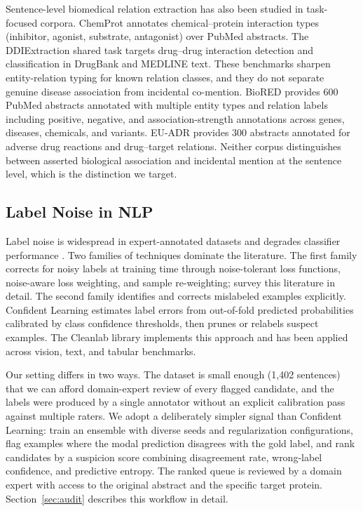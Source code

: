\documentclass[sn-basic,pdflatex]{sn-jnl}
\begin{document}
Sentence-level biomedical relation extraction has also been studied in task-focused corpora. ChemProt \citep{peng2018chemprot} annotates chemical--protein interaction types (inhibitor, agonist, substrate, antagonist) over PubMed abstracts. The DDIExtraction shared task \citep{segurabedmar2013ddi} targets drug--drug interaction detection and classification in DrugBank and MEDLINE text. These benchmarks sharpen entity-relation typing for known relation classes, and they do not separate genuine disease association from incidental co-mention. BioRED \citep{luo2022biored} provides 600 PubMed abstracts annotated with multiple entity types and relation labels including positive, negative, and association-strength annotations across genes, diseases, chemicals, and variants. EU-ADR \citep{vanmulligen2012euadr} provides 300 abstracts annotated for adverse drug reactions and drug--target relations. Neither corpus distinguishes between asserted biological association and incidental mention at the sentence level, which is the distinction we target.

\subsection{Label Noise in NLP}

Label noise is widespread in expert-annotated datasets and degrades classifier performance \citep{northcutt2021confident,song2022learning}. Two families of techniques dominate the literature. The first family corrects for noisy labels at training time through noise-tolerant loss functions, noise-aware loss weighting, and sample re-weighting; \citet{song2022learning} survey this literature in detail. The second family identifies and corrects mislabeled examples explicitly. Confident Learning \citep{northcutt2021confident} estimates label errors from out-of-fold predicted probabilities calibrated by class confidence thresholds, then prunes or relabels suspect examples. The Cleanlab library implements this approach and has been applied across vision, text, and tabular benchmarks.

Our setting differs in two ways. The dataset is small enough (1{,}402 sentences) that we can afford domain-expert review of every flagged candidate, and the labels were produced by a single annotator without an explicit calibration pass against multiple raters. We adopt a deliberately simpler signal than Confident Learning: train an ensemble with diverse seeds and regularization configurations, flag examples where the modal prediction disagrees with the gold label, and rank candidates by a suspicion score combining disagreement rate, wrong-label confidence, and predictive entropy. The ranked queue is reviewed by a domain expert with access to the original abstract and the specific target protein. Section~\ref{sec:audit} describes this workflow in detail.
\end{document}
